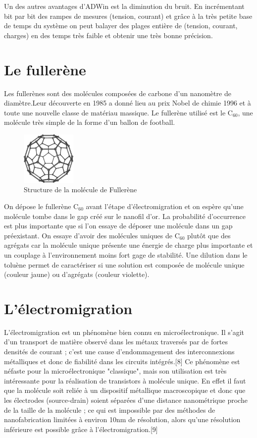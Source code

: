 Un des autres avantages d'ADWin est la diminution du bruit. En incrémentant bit par bit des rampes de mesures (tension, courant) et grâce à la très petite base de temps du système on peut balayer des plages entière de (tension, courant, charges) en des temps très faible et obtenir une très bonne précision.

\section{Le fullerène}
Les fullerènes sont des molécules composées de carbone d'un nanomètre de diamètre.Leur découverte en 1985 a donné lieu au prix Nobel de chimie 1996 et à toute une nouvelle classe de matériau massique. Le fullerène utilisé est le C$_{60}$, une molécule très simple de la forme d'un ballon de football.

\begin{figure}[h]
    \begin{center}
        \includegraphics[width=100px]{Images/C60.png}
        \caption{Structure de la molécule de Fullerène}
        \label{fig:}
    \end{center}
\end{figure}

On dépose le fullerène C$_{60}$ avant l'étape d'électromigration et on espère qu'une molécule tombe dans le gap créé sur le nanofil d'or. La probabilité d'occurrence est plus importante que si l'on essaye de déposer une molécule dans un gap préexistant. On essaye d'avoir des molécules uniques de C$_{60}$ plutôt que des agrégats car la molécule unique présente une énergie de charge plus importante et un couplage à l'environnement moins fort gage de stabilité. Une dilution dans le toluène permet de caractériser si une solution est composée de molécule unique (couleur jaune) ou d'agrégats (couleur violette).


\section{L'électromigration}
L'électromigration est un phénomène bien connu en microélectronique. Il s'agit d'un transport de matière observé dans les métaux traversés par de fortes densités de courant ; c'est une cause d'endommagement des interconnexions métalliques et donc de fiabilité dans les circuits intégrés.[8] Ce phénomène est néfaste pour la microélectronique "classique", mais son utilisation est très intéressante pour la réalisation de transistors à molécule unique. En effet il faut que la molécule soit reliée à un dispositif métallique macroscopique et donc que les électrodes (source-drain) soient séparées d'une distance nanométrique proche de la taille de la molécule ; ce qui est impossible par des méthodes de nanofabrication limitées à environ 10nm de résolution, alors qu'une résolution inférieure est possible grâce à l'électromigration.[9]\\

